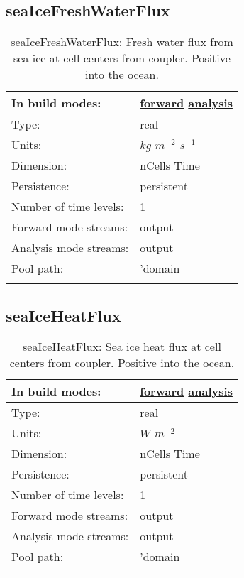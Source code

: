 \subsection[seaIceFreshWaterFlux]{seaIceFreshWaterFlux}
\label{subsec:var_sec_forcing_seaIceFreshWaterFlux}
\begin{center}
\begin{longtable}{| p{2.0in} | p{4.0in} |}
        \hline 
        In build modes: & \hyperref[subsec:forward_var_tab_forcing]{forward} \hyperref[subsec:analysis_var_tab_forcing]{analysis} \\
        \hline 
        Type: & real \\
        \hline 
        Units: & $kg$ $m^{-2}$ $s^{-1}$ \\
        \hline 
        Dimension: & nCells Time \\
        \hline 
        Persistence: & persistent \\
        \hline 
        Number of time levels: & 1 \\
        \hline 
		 Forward mode streams: &  output \\
        \hline 
		 Analysis mode streams: &  output \\
        \hline 
            Pool path: & 'domain %
 \\
		 \hline 
    \caption{seaIceFreshWaterFlux: Fresh water flux from sea ice at cell centers from coupler. Positive into the ocean.}
\end{longtable}
\end{center}
\subsection[seaIceHeatFlux]{seaIceHeatFlux}
\label{subsec:var_sec_forcing_seaIceHeatFlux}
\begin{center}
\begin{longtable}{| p{2.0in} | p{4.0in} |}
        \hline 
        In build modes: & \hyperref[subsec:forward_var_tab_forcing]{forward} \hyperref[subsec:analysis_var_tab_forcing]{analysis} \\
        \hline 
        Type: & real \\
        \hline 
        Units: & $W$ $m^{-2}$ \\
        \hline 
        Dimension: & nCells Time \\
        \hline 
        Persistence: & persistent \\
        \hline 
        Number of time levels: & 1 \\
        \hline 
		 Forward mode streams: &  output \\
        \hline 
		 Analysis mode streams: &  output \\
        \hline 
            Pool path: & 'domain %
 \\
		 \hline 
    \caption{seaIceHeatFlux: Sea ice heat flux at cell centers from coupler. Positive into the ocean.}
\end{longtable}
\end{center}
